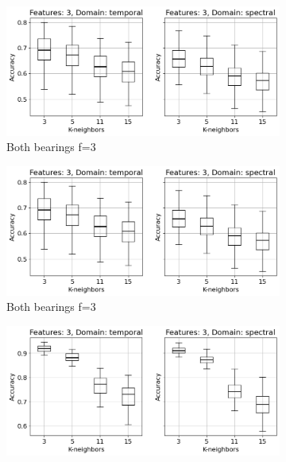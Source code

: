 \documentclass{llncs}
\begin{document}
\begin{figure}
	\centering
     \begin{subfigure}[b]{0.45\textwidth}
         \centering
         \includegraphics[width=\textwidth]{fig/combinations-mafaulda/all-axis-all-bearings-f3.png}
         \caption{Both bearings f=3}
     \end{subfigure}
     \hfill
     \begin{subfigure}[b]{0.45\textwidth}
         \centering
         \includegraphics[width=\textwidth]{fig/combinations-mafaulda/all-axis-all-bearings-f3.png}
         \caption{Both bearings f=3}
     \end{subfigure}
     \hfill
     \begin{subfigure}[b]{0.45\textwidth}
         \centering
         \includegraphics[width=\textwidth]{fig/combinations-mafaulda/all-axis-severity-f3.png}

\end{subfigure}
\end{figure}
\end{document}
